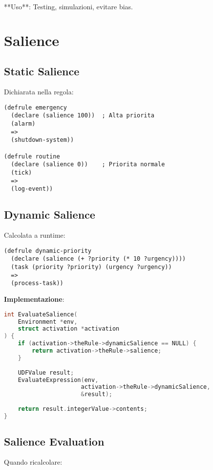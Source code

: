 **Uso**: Testing, simulazioni, evitare bias.

\section{Salience}

\subsection{Static Salience}

Dichiarata nella regola:

\begin{lstlisting}[language=CLIPS]
(defrule emergency
  (declare (salience 100))  ; Alta priorita
  (alarm)
  =>
  (shutdown-system))

(defrule routine
  (declare (salience 0))    ; Priorita normale
  (tick)
  =>
  (log-event))
\end{lstlisting}

\subsection{Dynamic Salience}

Calcolata a runtime:

\begin{lstlisting}[language=CLIPS]
(defrule dynamic-priority
  (declare (salience (+ ?priority (* 10 ?urgency))))
  (task (priority ?priority) (urgency ?urgency))
  =>
  (process-task))
\end{lstlisting}

\textbf{Implementazione}:

\begin{lstlisting}[language=C]
int EvaluateSalience(
    Environment *env,
    struct activation *activation
) {
    if (activation->theRule->dynamicSalience == NULL) {
        return activation->theRule->salience;
    }
    
    UDFValue result;
    EvaluateExpression(env, 
                      activation->theRule->dynamicSalience,
                      &result);
    
    return result.integerValue->contents;
}
\end{lstlisting}

\subsection{Salience Evaluation}

Quando ricalcolare:

